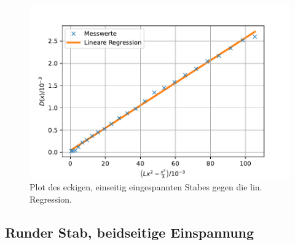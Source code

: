 \begin{figure}[H]
  \centering
  \includegraphics{pictures/Lineare Regression2.pdf}
  \caption{Plot des eckigen, einseitig eingespannten Stabes gegen die lin. Regression.}
  \label{fig:plot1}
\end{figure}

\subsection{Runder Stab, beidseitige Einspannung}


